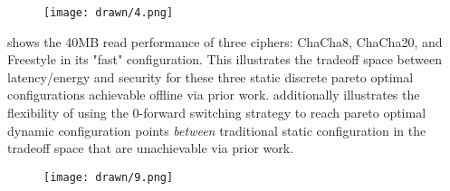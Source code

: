 \begin{figure}[ht]
 \centering
  \texttt{[image: drawn/4.png]}
   \caption{}\label{fig:navigating-the-space}
\end{figure}

 shows the 40MB read performance of three ciphers:
ChaCha8, ChaCha20, and Freestyle in its "fast" configuration. This illustrates
the tradeoff space between latency/energy and security for these three static
discrete pareto optimal configurations achievable offline via prior work.
 additionally illustrates the flexibility of
\SYSTEM{} using the 0-forward switching strategy to reach pareto optimal dynamic
configuration points \emph{between} traditional static configuration in the
tradeoff space that are unachievable via prior work.


\begin{figure}[ht]
 \centering
  \texttt{[image: drawn/9.png]}
   \caption{}\label{fig:strategy-vs-strategy}
\end{figure}


